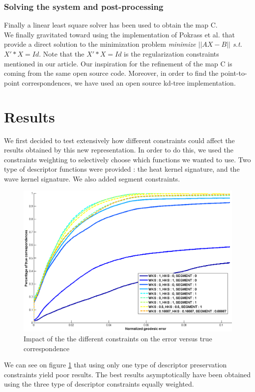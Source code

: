 \documentclass[10pt,twocolumn,letterpaper]{article}
\begin{document}
\subsubsection*{Solving the system and post-processing}
Finally a linear least square solver has been used to obtain the map C. \\

We finally gravitated toward using the implementation of Pokrass et al. that provide a direct solution to the minimization problem \textit{minimize $||AX - B||$ s.t. $X'*X = Id$}. Note that the $X'*X = Id$ is the regularization constraints mentioned in our article. Our inspiration for the refinement of the map C is coming from the same open source code. Moreover, in order to find the point-to-point correspondences, we have used an open source kd-tree implementation.



\section{Results} %
We first decided to test extensively how different constraints could affect the results obtained by this new representation. In order to do this, we used the constraints weighting to selectively choose which functions we wanted to use. Two type of descriptor functions were provided : the heat kernel signature, and the wave kernel signature. We also added segment constraints.

\begin{figure}[h]
\centering
\includegraphics[width=.4\textwidth]{Images/weights.png}
\caption{Impact of the the different constraints on the error versus true correspondence}
\label{fig_weights}
\end{figure}

We can see on figure \ref{fig_weights} that using only one type of descriptor preservation constraints yield poor results. The best results asymptotically have been obtained using the three type of descriptor constraints equally weighted.
\end{document}

